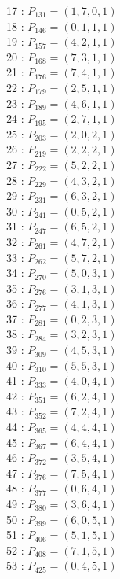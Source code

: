 \documentclass{article}
\begin{document}
{\begin{multicols}{3}
17 : $P_{131}=( 1, 7, 0, 1 )$\\
18 : $P_{146}=( 0, 1, 1, 1 )$\\
19 : $P_{157}=( 4, 2, 1, 1 )$\\
20 : $P_{168}=( 7, 3, 1, 1 )$\\
21 : $P_{176}=( 7, 4, 1, 1 )$\\
22 : $P_{179}=( 2, 5, 1, 1 )$\\
23 : $P_{189}=( 4, 6, 1, 1 )$\\
24 : $P_{195}=( 2, 7, 1, 1 )$\\
25 : $P_{203}=( 2, 0, 2, 1 )$\\
26 : $P_{219}=( 2, 2, 2, 1 )$\\
27 : $P_{222}=( 5, 2, 2, 1 )$\\
28 : $P_{229}=( 4, 3, 2, 1 )$\\
29 : $P_{231}=( 6, 3, 2, 1 )$\\
30 : $P_{241}=( 0, 5, 2, 1 )$\\
31 : $P_{247}=( 6, 5, 2, 1 )$\\
32 : $P_{261}=( 4, 7, 2, 1 )$\\
33 : $P_{262}=( 5, 7, 2, 1 )$\\
34 : $P_{270}=( 5, 0, 3, 1 )$\\
35 : $P_{276}=( 3, 1, 3, 1 )$\\
36 : $P_{277}=( 4, 1, 3, 1 )$\\
37 : $P_{281}=( 0, 2, 3, 1 )$\\
38 : $P_{284}=( 3, 2, 3, 1 )$\\
39 : $P_{309}=( 4, 5, 3, 1 )$\\
40 : $P_{310}=( 5, 5, 3, 1 )$\\
41 : $P_{333}=( 4, 0, 4, 1 )$\\
42 : $P_{351}=( 6, 2, 4, 1 )$\\
43 : $P_{352}=( 7, 2, 4, 1 )$\\
44 : $P_{365}=( 4, 4, 4, 1 )$\\
45 : $P_{367}=( 6, 4, 4, 1 )$\\
46 : $P_{372}=( 3, 5, 4, 1 )$\\
47 : $P_{376}=( 7, 5, 4, 1 )$\\
48 : $P_{377}=( 0, 6, 4, 1 )$\\
49 : $P_{380}=( 3, 6, 4, 1 )$\\
50 : $P_{399}=( 6, 0, 5, 1 )$\\
51 : $P_{406}=( 5, 1, 5, 1 )$\\
52 : $P_{408}=( 7, 1, 5, 1 )$\\
53 : $P_{425}=( 0, 4, 5, 1 )$\\

\end{multicols}}
\end{document}
